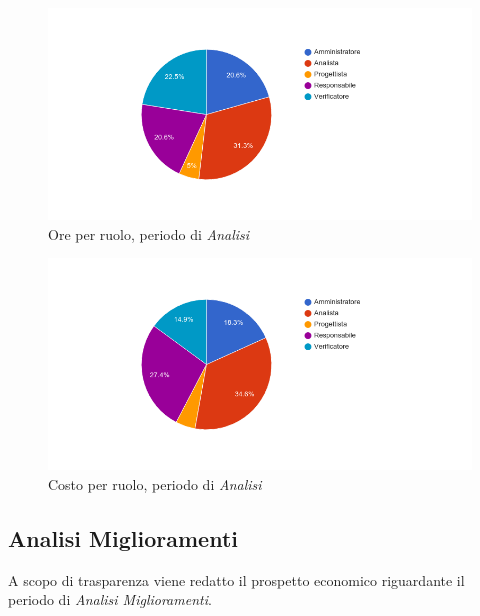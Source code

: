 \begin{figure}[H]
  \begin{center}
    \includegraphics[width=15cm]{res/img/prospettoEconomico/orePerRuoloAnalisi.png}
  \caption{Ore per ruolo, periodo di \textit{Analisi}}
  \end{center} 
\end{figure}  

\begin{figure}[H]
  \begin{center}
    \includegraphics[width=15cm]{res/img/prospettoEconomico/costoPerRuoloAnalisi.png}
  \caption{Costo per ruolo, periodo di \textit{Analisi}}
  \end{center} 
\end{figure}  


\subsection{Analisi Miglioramenti}
A scopo di trasparenza viene redatto il prospetto economico riguardante il periodo di \textit{Analisi Miglioramenti}.

